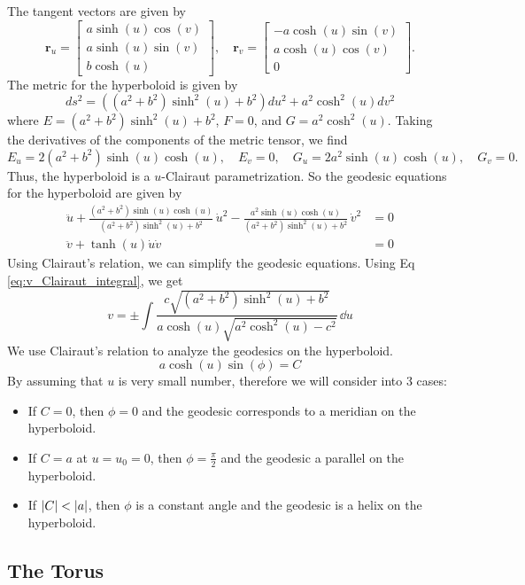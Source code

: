 \documentclass[12pt]{article}
\begin{document}
The tangent vectors are given by
\[
    \mathbf{r}_u = \begin{bmatrix} a \sinh (u) \cos (v) \\ a \sinh (u) \sin (v) \\ b \cosh (u) \end{bmatrix}, \quad \mathbf{r}_v = \begin{bmatrix} -a \cosh (u) \sin (v) \\ a \cosh (u) \cos (v) \\ 0 \end{bmatrix}.
\]
The metric for the hyperboloid is given by
\[
    ds^2 = ((a^2 + b^2)\sinh^{2}(u) + b^2) du^2 + a^2 \cosh^{2}(u) dv^2
\]
where \(E = (a^2 + b^2)\sinh^{2}(u) + b^2\), \(F = 0\), and \(G = a^2 \cosh^{2}(u)\).
Taking the derivatives of the components of the metric tensor, we find
\[
    E_u = 2(a^2 + b^2)\sinh(u)\cosh(u), \quad E_v = 0, \quad G_u = 2a^2 \sinh(u) \cosh(u), \quad G_v = 0.
\]
Thus, the hyperboloid is a $u$-Clairaut parametrization.
So the geodesic equations for the hyperboloid are given by
\begin{align*}
    \ddot{u} + \frac{(a^2 + b^2)\sinh(u)\cosh(u)}{(a^2 + b^2)\sinh^{2}(u) + b^2}\,\dot{u}^2 - \frac{a^2 \sinh(u) \cosh(u)}{(a^2 + b^2)\sinh^{2}(u) + b^2}\,\dot{v}^{2} &= 0 \\
    \ddot{v} + \tanh(u) \dot{u} \dot{v} &= 0
\end{align*}
Using Clairaut's relation, we can simplify the geodesic equations.
Using Eq \eqref{eq:v_Clairaut_integral}, we get
\[
    v = \pm \int \frac{c\sqrt{(a^2 + b^2)\sinh^2(u) + b^2}}{a\cosh(u)\sqrt{a^2\cosh^2(u) - c^2}}\,\dd{u}
\]
We use Clairaut's relation to analyze the geodesics on the hyperboloid.
\[
    a \cosh(u) \sin(\phi) = C  
\]
By assuming that $u$ is very small number, therefore we will consider into 3 cases:
\begin{itemize}
    \item If $C = 0$, then $\phi = 0$ and the geodesic corresponds to a meridian on the hyperboloid.
    \item If $C = a$ at $u = u_0 = 0$, then $\phi = \frac{\pi}{2}$ and the geodesic a parallel on the hyperboloid.
    \item If $\abs{C} < \abs{a}$, then $\phi$ is a constant angle and the geodesic is a helix on the hyperboloid.
\end{itemize}

\subsection{The Torus}
\end{document}
